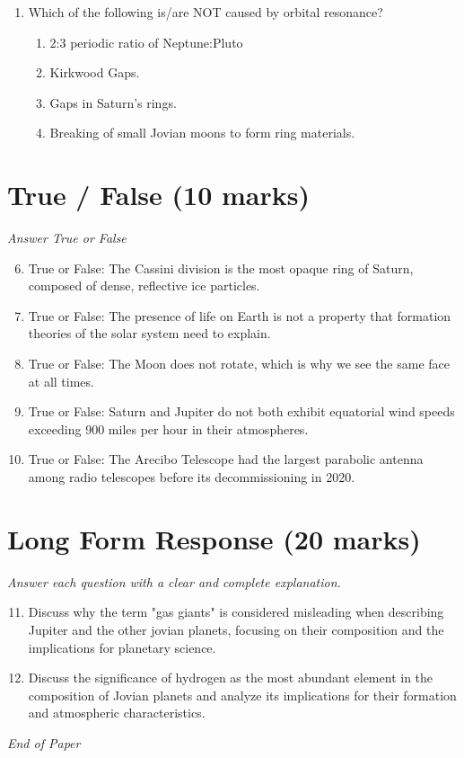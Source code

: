 \documentclass[12pt]{article}
\begin{document}
\begin{enumerate}[label=\arabic*.]
\begin{enumerate}[label=(\alph*)]
    \item size of the planet
    \item presence of an atmosphere
    \item distance from the sun
    \item rotation period
\end{enumerate}
\item Which of the following is/are NOT caused by orbital resonance?
\begin{enumerate}[label=(\alph*)]
    \item 2:3 periodic ratio of Neptune:Pluto
    \item Kirkwood Gaps.
    \item Gaps in Saturn's rings.
    \item Breaking of small Jovian moons to form ring materials.
\end{enumerate}
\end{enumerate}

\section*{True / False (10 marks)}
\textit{Answer True or False}
\begin{enumerate}[label=\arabic*.]
\setcounter{enumi}{5}
\item True or False: The Cassini division is the most opaque ring of Saturn, composed of dense, reflective ice particles.
\item True or False: The presence of life on Earth is not a property that formation theories of the solar system need to explain.
\item True or False: The Moon does not rotate, which is why we see the same face at all times.
\item True or False: Saturn and Jupiter do not both exhibit equatorial wind speeds exceeding 900 miles per hour in their atmospheres.
\item True or False: The Arecibo Telescope had the largest parabolic antenna among radio telescopes before its decommissioning in 2020.
\end{enumerate}

\section*{Long Form Response (20 marks)}
\textit{Answer each question with a clear and complete explanation.}
\begin{enumerate}[label=\arabic*.]
\setcounter{enumi}{10}
\item Discuss why the term "gas giants" is considered misleading when describing Jupiter and the other jovian planets, focusing on their composition and the implications for planetary science.
\item Discuss the significance of hydrogen as the most abundant element in the composition of Jovian planets and analyze its implications for their formation and atmospheric characteristics.
\end{enumerate}

\vfill
\noindent\textit{End of Paper}
\end{document}
